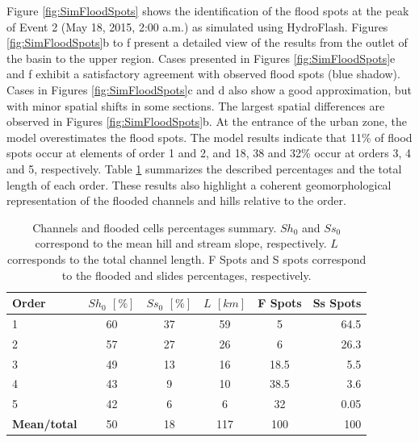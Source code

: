 \documentclass[hess, manuscript]{copernicus}
\begin{document}
Figure \ref{fig:SimFloodSpots} shows the identification of the flood spots at the peak of Event 2 (May 18, 2015, 2:00 a.m.) as simulated using HydroFlash. Figures \ref{fig:SimFloodSpots}b to f present a detailed view of the results from the outlet of the basin to the upper region. Cases presented in Figures \ref{fig:SimFloodSpots}e and f exhibit a satisfactory agreement with observed flood spots (blue shadow).  Cases in Figures \ref{fig:SimFloodSpots}c and d also show a good approximation, but with minor spatial shifts in some sections. The largest spatial differences are observed in Figures \ref{fig:SimFloodSpots}b. At the entrance of the urban zone, the model overestimates the flood spots. The model results indicate that 11\% of flood spots occur at elements of order 1 and 2, and 18, 38 and 32\% occur at orders 3, 4 and 5, respectively.  Table \ref{tab:flash}  summarizes the described percentages and the total length of each order. These results also highlight a coherent geomorphological representation of the flooded channels and hills relative to the order.\\   


\begin{table}[!h]
\centering
  \caption{Channels and flooded cells percentages summary.  $Sh_0$ and $Ss_0$ correspond to the mean hill and stream slope, respectively. $L$ corresponds to the total channel length. F Spots and S spots correspond to the flooded and slides percentages, respectively.}
\begin{tabular}{lccccr}
\hline
Order & $Sh_0$ $[\%]$ & $Ss_0$  $[\%]$ & $L$ $[km]$ & F Spots & Ss Spots \\
\hline
1 & 60 & 37 & 59 & 5 & 64.5 \\
2 & 57 & 27 & 26 & 6 & 26.3\\
3 & 49 & 13 & 16 & 18.5 & 5.5\\
4 & 43 & 9 & 10 & 38.5 & 3.6\\
5 & 42 & 6 & 6 & 32 & 0.05\\
\hline
\textbf{Mean/total} & 50 & 18 & 117 & 100 & 100 \\
\hline
\end{tabular}
\label{tab:flash}
\end{table}
\end{document}
